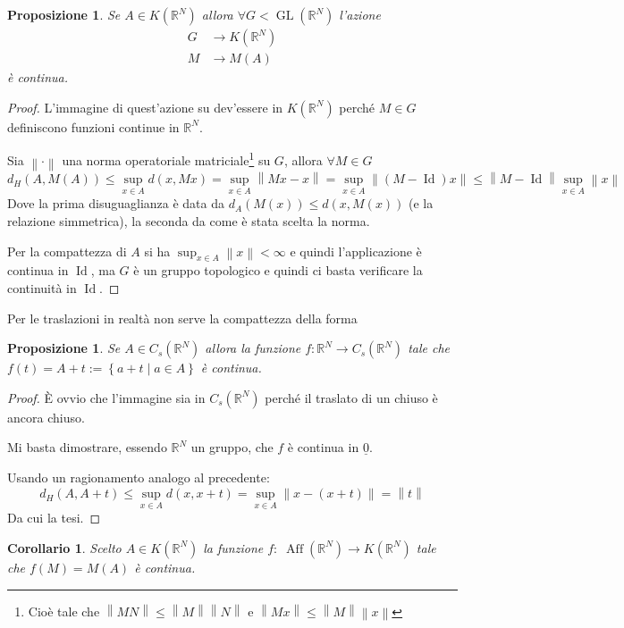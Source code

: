 \documentclass[a4paper,10pt]{article}
\newcounter{counter1}
\theoremstyle{plain}
\newtheorem{mypro}[counter1]{Proposizione}
\newtheorem{mycor}[counter1]{Corollario}
\theoremstyle{definition}
\theoremstyle{remark}
\newcommand{\ubar}[1]{\underline{#1}}
\newcommand{\set}[1]{\left\{#1\right\}}
\newcommand{\pa}[1]{\left(#1\right)}
\newcommand{\norm}[1]{\left\|#1\right\|}
\DeclareMathOperator{\id}{Id}
\DeclareMathOperator{\gl}{GL}
\DeclareMathOperator{\aff}{Aff}
\begin{document}
\begin{mypro}
  Se $A \in K(\mathbb{R}^N)$ allora $\forall G < \gl (\mathbb{R}^N)$
  l'azione
  \begin{align*}
    G &\rightarrow K(\mathbb{R}^N) \\  
    M &\rightarrow M(A)
  \end{align*}
  è continua.
\end{mypro}
\begin{proof}
  L'immagine di quest'azione su dev'essere in $K(\mathbb{R}^N)$ perché
  $M\in G$ definiscono funzioni continue in $\mathbb{R}^N$.

  Sia $\norm{\cdot}$ una norma operatoriale matriciale\footnote{Cioè
    tale che $\norm{MN} \le \norm{M}\norm{N}$ e $\norm{Mx} \le
    \norm{M}\norm{x}$} su $G$, allora $\forall M \in G$
  \[ d_H(A, M(A)) \le \sup _{x \in A} d(x,Mx) = \sup _{x \in A}
  \norm{Mx -x} = \sup _{x \in A} \norm{ \pa{ M - \id} x } \le \norm{ M
    - \id } \sup _{x \in A} \norm{x} \]
  Dove la prima disuguaglianza è data da $d_A (M(x)) \le d (x,M(x))$
  (e la relazione simmetrica), la seconda da come è stata scelta la
  norma.

  Per la compattezza di $A$ si ha $\sup _{x \in A} \norm{x} < \infty$ e quindi
  l'applicazione è continua in $\id$, ma $G$ è un gruppo topologico e
  quindi ci basta verificare la continuità in $\id$.
\end{proof}

Per le traslazioni in realtà non serve la compattezza della forma
\begin{mypro}
  Se $A \in C_s(\mathbb{R}^N)$ allora la funzione $f: \mathbb{R}^N \to
  C_s(\mathbb{R}^N)$ tale che $f(t) = A + t := \set { a + t \mid a \in
    A}$ è continua.
\end{mypro}
\begin{proof}
  È ovvio che l'immagine sia in $C_s(\mathbb{R}^N)$ perché il traslato
  di un chiuso è ancora chiuso.
  
  Mi basta dimostrare, essendo $\mathbb{R}^N$ un gruppo, che $f$ è
  continua in $\ubar{0}$.
  
  Usando un ragionamento analogo al precedente:
  \[ d_H(A, A+t) \le \sup _{x \in A} d(x, x+t) = \sup _{x \in A}
  \norm{x-(x+t)} = \norm{t} \]
  Da cui la tesi.
\end{proof}

\begin{mycor}
  Scelto $A \in K(\mathbb{R}^N)$ la funzione $f:\; \aff( \mathbb{R}^N)
  \to K(\mathbb{R}^N)$ tale che $f(M) = M(A)$ è continua.
\end{mycor}
\end{document}
